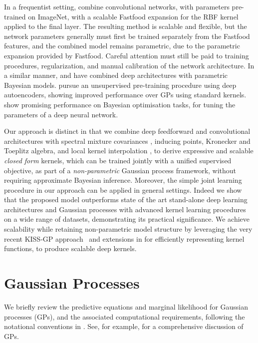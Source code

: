 \documentclass[twoside,11pt]{article}
\begin{document}
In a frequentist setting, \citet{yang2014deep} combine convolutional networks, with parameters
pre-trained on ImageNet, with a scalable Fastfood \citep{le2013fastfood} expansion for the
RBF kernel applied to the final layer.  The resulting method is scalable and flexible, but the
network parameters generally must first be trained separately from the Fastfood features,
and the combined model remains parametric, due to the parametric expansion provided by
Fastfood. Careful attention must still be paid to training procedures, regularization,
and manual calibration of the network architecture.  In a similar manner, \citet{huang2015scalable}
and \citet{snoek2015scalable} have combined deep architectures with parametric Bayesian models.
\citet{huang2015scalable} pursue an unsupervised pre-training procedure using deep autoencoders,
showing improved performance over GPs using standard kernels.  \citet{snoek2015scalable} show promising
performance on Bayesian optimisation tasks, for tuning the parameters of a deep neural network.

Our approach is distinct in that we combine deep feedforward and convolutional architectures with
spectral mixture covariances \citep{wilsonadams2013}, inducing points, Kronecker and Toeplitz
algebra, and local kernel interpolation \citep{wilsonnickisch2015, wdn2015}, to derive
expressive and scalable \emph{closed form} kernels, which can be trained jointly with a unified
supervised objective, as part of a
\emph{non-parametric} Gaussian process framework, without requiring approximate
Bayesian inference.  Moreover, the simple joint learning procedure in our approach 
can be applied in general settings.  Indeed we show that the proposed model outperforms
state of the art stand-alone deep learning architectures and Gaussian processes
with advanced kernel learning procedures on a wide range of datasets, demonstrating
its practical significance.  We achieve scalability while retaining non-parametric model structure by leveraging the
very recent KISS-GP approach~\citep{wilsonnickisch2015} and extensions in \citet{wdn2015} for efficiently representing
kernel functions, to produce scalable deep kernels.


\section{Gaussian Processes}
\label{sec: gps}

We briefly review the predictive equations and marginal likelihood for Gaussian processes (GPs), and 
the associated computational requirements, following the notational conventions in 
\citet{wdn2015}.  See, for example, \citet{rasmussen06} for a comprehensive 
discussion of GPs.
\end{document}
